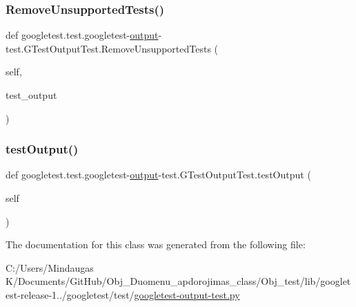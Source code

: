 \subsubsection{\texorpdfstring{RemoveUnsupportedTests()}{RemoveUnsupportedTests()}}
{\footnotesize\ttfamily def googletest.\+test.\+googletest-\/\mbox{\hyperlink{namespacegoogletest_1_1test_1_1googletest-output-test_a6773c2217ae4694b4db5610620562437}{output}}-\/test.\+G\+Test\+Output\+Test.\+Remove\+Unsupported\+Tests (\begin{DoxyParamCaption}\item[{}]{self,  }\item[{}]{test\+\_\+output }\end{DoxyParamCaption})}

\mbox{\label{classgoogletest_1_1test_1_1googletest-output-test_1_1_g_test_output_test_a2809c6a299e88f9aa9b349a62a3591d7}} 
\subsubsection{\texorpdfstring{testOutput()}{testOutput()}}
{\footnotesize\ttfamily def googletest.\+test.\+googletest-\/\mbox{\hyperlink{namespacegoogletest_1_1test_1_1googletest-output-test_a6773c2217ae4694b4db5610620562437}{output}}-\/test.\+G\+Test\+Output\+Test.\+test\+Output (\begin{DoxyParamCaption}\item[{}]{self }\end{DoxyParamCaption})}



The documentation for this class was generated from the following file\+:\begin{DoxyCompactItemize}
\item 
C\+:/\+Users/\+Mindaugas K/\+Documents/\+Git\+Hub/\+Obj\+\_\+\+Duomenu\+\_\+apdorojimas\+\_\+class/\+Obj\+\_\+test/lib/googletest-\/release-\/1../googletest/test/\mbox{\hyperlink{_obj__test_2lib_2googletest-release-1_88_81_2googletest_2test_2googletest-output-test_8py}{googletest-\/output-\/test.\+py}}\end{DoxyCompactItemize}
